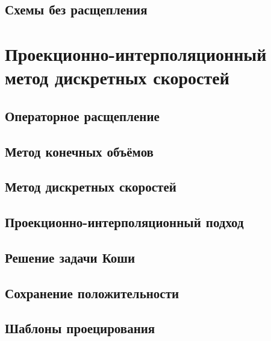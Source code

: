 
\subsection{Схемы без расщепления}



\section{Проекционно-интерполяционный метод дискретных скоростей} \label{sect:method}

\subsection{Операторное расщепление}
\subsection{Метод конечных объёмов}
\subsection{Метод дискретных скоростей}
\subsection{Проекционно-интерполяционный подход}
\subsection{Решение задачи Коши}
\subsection{Сохранение положительности}
\subsection{Шаблоны проецирования}


\clearpage
